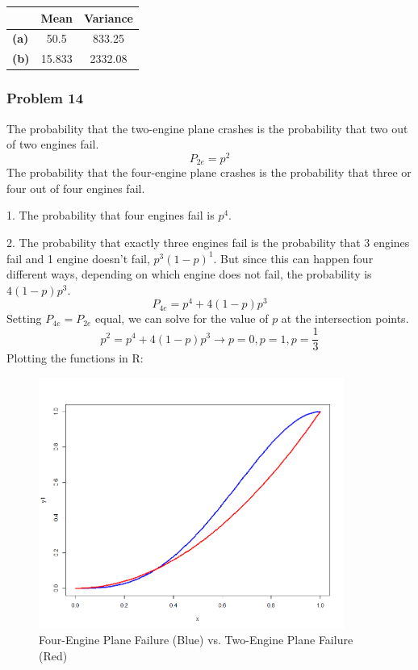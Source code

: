 \documentclass[11pt]{extarticle}
\begin{document}
\begin{table}[ht!]
\centering
\begin{tabular}{l|cc}
\toprule
& \textbf{Mean} & \textbf{Variance} \\
\midrule
\textbf{(a)} & 50.5 & 833.25 \\
\textbf{(b)} & 15.833 & 2332.08 \\
\toprule
\end{tabular}
\end{table}


 \subsubsection*{Problem 14}
 
 
 The probability that the two-engine plane crashes is the probability that two out of two engines fail.  
 $$ P_{2e} =  p^2  $$
The probability that the four-engine plane crashes is the probability that three or four out of four engines fail.

1. The probability that four engines fail is $p^4$. 

2. The probability that exactly three engines fail is the probability that 3 engines fail and 1 engine doesn't fail, $p^3(1-p)^1$. But since this can happen four different ways, depending on which engine does not fail, the probability is $4(1-p)p^3$.
$$ P_{4e} =  p^4 + 4(1-p)p^3$$
Setting $P_{4e} = P_{2e}$ equal, we can solve for the value of $p$ at the intersection points. 
$$ p^2=  p^4 + 4(1-p)p^3 \rightarrow p=0, p=1, p=\frac{1}{3}$$
Plotting the functions in R:
\begin{figure}[H]
\centering
\includegraphics[width=100mm]{EnginesFull.png}
\caption{Four-Engine Plane Failure (Blue) vs. Two-Engine Plane Failure (Red)}
\end{figure}
\end{document}
